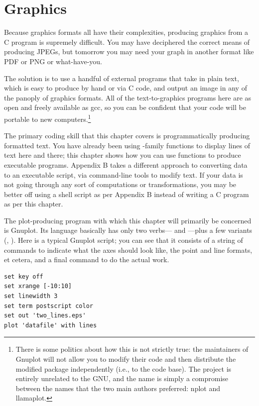 \chapter{Graphics} \label{gnuplot} 

Because graphics formats all have their complexities,
producing graphics from a C program is supremely difficult. You may have
deciphered the correct means of producing JPEGs, but tomorrow you may
need your graph in another format like PDF or PNG or what-have-you.

The solution is to use a handful of external
programs that take in plain text, which is easy to produce by hand or
via C code, and output an image in any of the panoply of graphics
formats.  All of the text-to-graphics programs here are as open and freely
available as gcc, so you can be confident that your code will be portable
to new computers.\footnote{There is some politics about how this is not
strictly true: the maintainers of Gnuplot will not allow you to modify
their code and then distribute the modified package independently (i.e.,
to  the code base). The project is entirely unrelated to the
GNU, and the name is simply a compromise between the names that the two
main authors preferred: nplot and llamaplot.}

The primary coding skill that this chapter covers is programmatically
producing formatted text. You have already been using -family
functions to display lines of text here and there; this chapter shows
how you can use  functions to produce executable programs.
Appendix B takes a different approach to converting data to an executable
script, via command-line tools to modify text. If your data is not going
through any sort of computations or transformations, you may be better
off using a shell script as per Appendix B instead of writing a C
program as per this chapter.

The plot-producing program with which this chapter will primarily be
concerned is Gnuplot. Its language
basically has only two verbs--- and ---plus a few
variants (, ). Here is a typical Gnuplot script;
you can see that it
consists of a string of  commands to indicate what the axes
should look like, the point and line formats, et cetera, and a final
 command to do the actual work.
\begin{lstlisting}
set key off
set xrange [-10:10]
set linewidth 3
set term postscript color
set out 'two_lines.eps'
plot 'datafile' with lines
\end{lstlisting}

